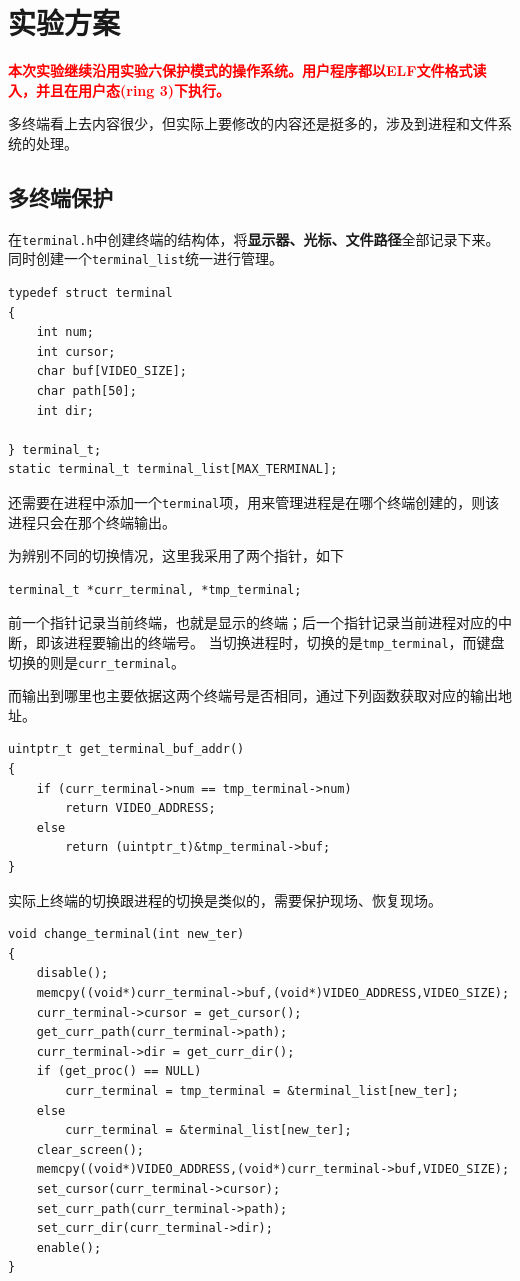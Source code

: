 \documentclass[logo,reportComp]{thesis}
\begin{document}
\section{实验方案}
{\textbf{\textcolor{red}{本次实验继续沿用实验六保护模式的操作系统。用户程序都以ELF文件格式读入，并且在用户态(ring 3)下执行。}}}

多终端看上去内容很少，但实际上要修改的内容还是挺多的，涉及到进程和文件系统的处理。

\subsection{多终端保护}
在\verb'terminal.h'中创建终端的结构体，将\textbf{显示器、光标、文件路径}全部记录下来。
同时创建一个\verb'terminal_list'统一进行管理。
\begin{lstlisting}
typedef struct terminal
{
	int num;
	int cursor;
	char buf[VIDEO_SIZE];
	char path[50];
	int dir;

} terminal_t;
static terminal_t terminal_list[MAX_TERMINAL];
\end{lstlisting}

还需要在进程中添加一个\verb'terminal'项，用来管理进程是在哪个终端创建的，则该进程只会在那个终端输出。

为辨别不同的切换情况，这里我采用了两个指针，如下
\begin{lstlisting}
terminal_t *curr_terminal, *tmp_terminal;
\end{lstlisting}
前一个指针记录当前终端，也就是显示的终端；后一个指针记录当前进程对应的中断，即该进程要输出的终端号。
当切换进程时，切换的是\verb'tmp_terminal'，而键盘切换的则是\verb'curr_terminal'。

而输出到哪里也主要依据这两个终端号是否相同，通过下列函数获取对应的输出地址。
\begin{lstlisting}
uintptr_t get_terminal_buf_addr()
{
	if (curr_terminal->num == tmp_terminal->num)
		return VIDEO_ADDRESS;
	else
		return (uintptr_t)&tmp_terminal->buf;
}
\end{lstlisting}

实际上终端的切换跟进程的切换是类似的，需要保护现场、恢复现场。
\begin{lstlisting}
void change_terminal(int new_ter)
{
	disable();
	memcpy((void*)curr_terminal->buf,(void*)VIDEO_ADDRESS,VIDEO_SIZE);
	curr_terminal->cursor = get_cursor();
	get_curr_path(curr_terminal->path);
	curr_terminal->dir = get_curr_dir();
	if (get_proc() == NULL)
		curr_terminal = tmp_terminal = &terminal_list[new_ter];
	else
		curr_terminal = &terminal_list[new_ter];
	clear_screen();
	memcpy((void*)VIDEO_ADDRESS,(void*)curr_terminal->buf,VIDEO_SIZE);
	set_cursor(curr_terminal->cursor);
	set_curr_path(curr_terminal->path);
	set_curr_dir(curr_terminal->dir);
	enable();
}
\end{lstlisting}
\end{document}
